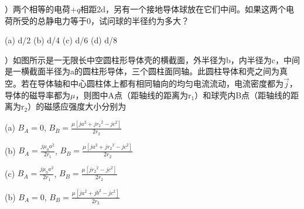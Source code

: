 ）\hspace{0.2em}两个相等的电荷+$q$相距2d，另有一个接地导体球放在它们中间。如果这两个电荷所受的总静电力等于0，试问球的半径约为多大？

\vspace{0.2cm}
(a)\hspace{0.6em} d/2 \hspace{1.8em}
(b)\hspace{0.6em} d/4 \hspace{1.8em}
(c)\hspace{0.6em} d/6 \hspace{1.8em}
(d)\hspace{0.6em} d/8 \hspace{1.8em}


\vspace{0.2cm}

）\hspace{0.2em}如图所示是一无限长中空圆柱形导体壳的横截面，外半径为b，内半径为c，中间是一横截面半径为a的圆柱形导体，三个圆柱面同轴。此圆柱导体和壳之间为真空。若在导体轴和中心圆柱体上都有相同轴向的均匀电流流动，电流密度都为$\Vec{j}$，导体的磁导率都为$\mu$，则图中A点（距轴线的距离为$\mathrm{r_1}$）和球壳内B点（距轴线的距离为$\mathrm{r_2}$）的磁感应强度大小分别为

\vspace{0.5cm}
(a)\hspace{0.6em} $B_A = 0$, \quad $B_B = \displaystyle{\frac{\mu [ja^2 + j{r_2}^2 - jc^2]}{2r_2} }$
\vspace{0.5cm}

(b)\hspace{0.6em} $B_A = \displaystyle{\frac{j \mu_0 a^2}{2r_1}}$, \quad $B_B = \displaystyle{\frac{\mu [ja^2 + j{r_2}^2 - jc^2]}{2r_2} }$
\vspace{0.5cm}

(c)\hspace{0.6em} $B_A = \displaystyle{\frac{j \mu_0 a^2}{2r_1}}$, \quad $B_B = \displaystyle{\frac{\mu [j{r_2}^2 - jc^2]}{2r_2} }$ 
\vspace{0.5cm}

(b)\hspace{0.6em} $B_A = 0$, \quad  $B_B = \displaystyle{\frac{\mu [ja^2 + jb^2 - jc^2]}{2r_2} }$ 

\vspace{-6cm}

